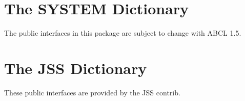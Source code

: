 \documentclass[10pt]{book}
\begin{document}


\chapter{The SYSTEM Dictionary}

The public interfaces in this package are subject to change with
\textsc{ABCL} 1.5.



\chapter{The JSS Dictionary}

These public interfaces are provided by the JSS contrib.






\printindex
\end{document}
